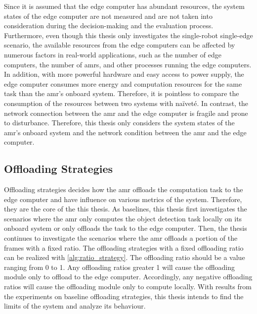 Since it is assumed that the edge computer has abundant resources, the system states of the edge computer are not measured and are not taken into consideration during the decision-making and the evaluation process. Furthermore, even though this thesis only investigates the single-robot single-edge scenario, the available resources from the edge computers can be affected by numerous factors in real-world applications, such as the number of edge computers, the number of \glspl{amr}, and other processes running the edge computers. In addition, with more powerful hardware and easy access to power supply, the edge computer consumes more energy and computation resources for the same task than the \gls{amr}'s onboard system. Therefore, it is pointless to compare the consumption of the resources between two systems with na\"{i}vet\'{e}. In contrast, the network connection between the \gls{amr} and the edge computer is fragile and prone to disturbance. Therefore, this thesis only considers the system states of the \gls{amr}'s onboard system and the network condition between the \gls{amr} and the edge computer. 

\subsection{Offloading Strategies}\label{sec:general_setup:offloading_strategies}

Offloading strategies decides how the \gls{amr} offloads the computation task to the edge computer and have influence on various metrics of the system. Therefore, they are the core of the this thesis. As baselines, this thesis first investigates the scenarios where the \gls{amr} only computes the object detection task locally on its onboard system or only offloads the task to the edge computer. Then, the thesis continues to investigate the scenarios where the \gls{amr} offloads a portion of the frames with a fixed ratio. The offloading strategies with a fixed offloading ratio can be realized with \cref{alg:ratio_strategy}. The offloading ratio should be a value ranging from 0 to 1. Any offloading ratios greater 1 will cause the offloading module only to offload to the edge computer. Accordingly, any negative offloading ratios will cause the offloading module only to compute locally. With results from the experiments on baseline offloading strategies, this thesis intends to find the limits of the system and analyze its behaviour. 


